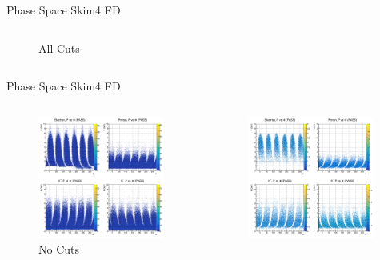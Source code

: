 \documentclass[aspectratio=169]{beamer}
\begin{document}
\begin{frame}{Phase Space  \hfill Skim4 FD}
\begin{columns}
\begin{figure}
        \caption{All Cuts}
    \end{figure}
    \end{columns}
\end{frame}

\begin{frame}{Phase Space  \hfill Skim4 FD}
\vspace*{-0.6cm}
    \begin{columns}
    \begin{figure}
        \centering
        \includegraphics[width=0.97\textwidth]{pdfs/hists/PASS/PhiP.png}
        \caption{No Cuts}
    \end{figure}
    \begin{figure}
        \centering
        \includegraphics[width=0.97\textwidth]{pdfs/all_cuts/PASS/PhiP.png}

\end{figure}
\end{columns}
\end{frame}
\end{document}
